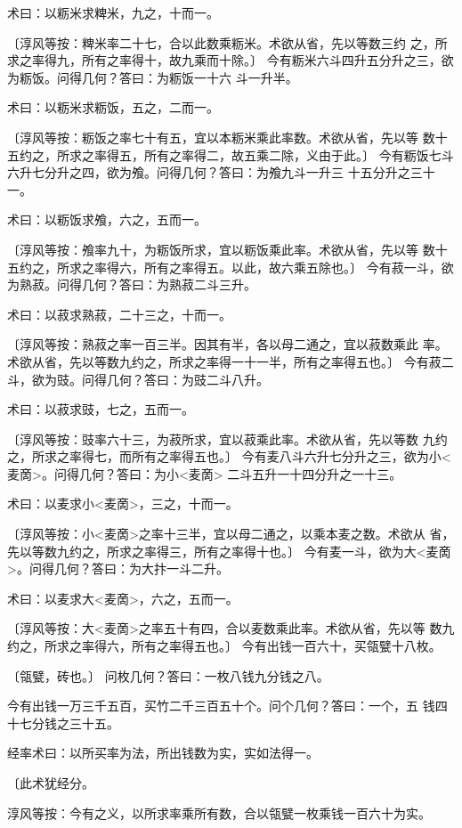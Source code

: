 \documentclass[a4paper,12pt,UTF8,twoside]{ctexbook}
\begin{document}
术曰：以粝米求粺米，九之，十而一。

〔淳风等按：粺米率二十七，合以此数乘粝米。术欲从省，先以等数三约 之，所求之率得九，所有之率得十，故九乘而十除。〕 今有粝米六斗四升五分升之三，欲为粝饭。问得几何？答曰：为粝饭一十六 斗一升半。

术曰：以粝米求粝饭，五之，二而一。

〔淳风等按：粝饭之率七十有五，宜以本粝米乘此率数。术欲从省，先以等 数十五约之，所求之率得五，所有之率得二，故五乘二除，义由于此。〕 今有粝饭七斗六升七分升之四，欲为飧。问得几何？答曰：为飧九斗一升三 十五分升之三十一。

术曰：以粝饭求飧，六之，五而一。

〔淳风等按：飧率九十，为粝饭所求，宜以粝饭乘此率。术欲从省，先以等 数十五约之，所求之率得六，所有之率得五。以此，故六乘五除也。〕 今有菽一斗，欲为熟菽。问得几何？答曰：为熟菽二斗三升。

术曰：以菽求熟菽，二十三之，十而一。

〔淳风等按：熟菽之率一百三半。因其有半，各以母二通之，宜以菽数乘此 率。术欲从省，先以等数九约之，所求之率得一十一半，所有之率得五也。〕 今有菽二斗，欲为豉。问得几何？答曰：为豉二斗八升。

术曰：以菽求豉，七之，五而一。

〔淳风等按：豉率六十三，为菽所求，宜以菽乘此率。术欲从省，先以等数 九约之，所求之率得七，而所有之率得五也。〕 今有麦八斗六升七分升之三，欲为小<麦啇>。问得几何？答曰：为小<麦啇> 二斗五升一十四分升之一十三。

术曰：以麦求小<麦啇>，三之，十而一。

〔淳风等按：小<麦啇>之率十三半，宜以母二通之，以乘本麦之数。术欲从 省，先以等数九约之，所求之率得三，所有之率得十也。〕 今有麦一斗，欲为大<麦啇>。问得几何？答曰：为大抃一斗二升。

术曰：以麦求大<麦啇>，六之，五而一。

〔淳风等按：大<麦啇>之率五十有四，合以麦数乘此率。术欲从省，先以等 数九约之，所求之率得六，所有之率得五也。〕 今有出钱一百六十，买瓴甓十八枚。

〔瓴甓，砖也。〕 问枚几何？答曰：一枚八钱九分钱之八。

今有出钱一万三千五百，买竹二千三百五十个。问个几何？答曰：一个，五 钱四十七分钱之三十五。

经率术曰：以所买率为法，所出钱数为实，实如法得一。

〔此术犹经分。

淳风等按：今有之义，以所求率乘所有数，合以瓴甓一枚乘钱一百六十为实。
\end{document}
